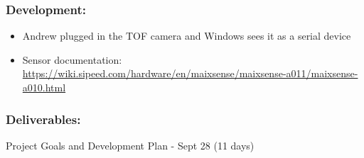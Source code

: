 			\subsubsection*{Development:}
				\begin{itemize}
					\item Andrew plugged in the TOF camera and Windows sees it as a serial device
					\item Sensor documentation:\\
				\url{https://wiki.sipeed.com/hardware/en/maixsense/maixsense-a011/maixsense-a010.html}	
				\end{itemize}

			\subsubsection*{Deliverables:}
				Project Goals and Development Plan - Sept 28 (11 days)


